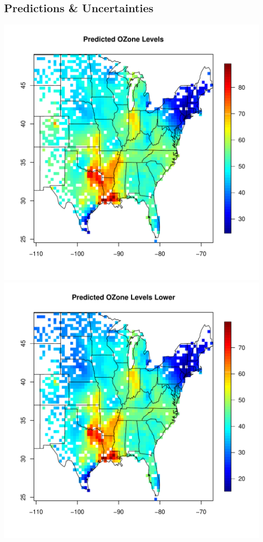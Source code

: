 \documentclass{article}                                                   %
\begin{document}
  \subsection{Predictions \& Uncertainties}
    \includegraphics{raw/center.pdf}
    \includegraphics{raw/lower.pdf}
\end{document}
